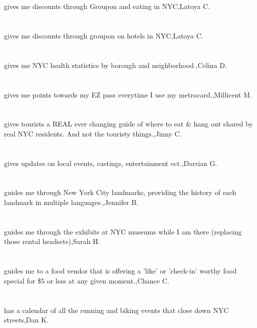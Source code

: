 \section{}gives me discounts through Groupon and  eating in NYC,Latoya C.
\section{}gives me discounts through groupon on hotels in NYC,Latoya C.
\section{}gives me NYC health statistics by borough and neighborhood.,Celina D.
\section{}  gives me points towards my EZ pass everytime I use my metrocard.,Millicent M.
\section{}gives tourists a REAL ever changing guide of where to eat \& hang out shared by real NYC residents. And not the touristy things.,Jinny C.
\section{}gives updates on local events, castings, entertainment ect.,Darrian G.
\section{}guides me through New York City landmarks, providing the history of each landmark in multiple languages.,Jennifer B.	
\section{}guides me through the exhibits at NYC museums while I am there (replacing those rental headsets),Sarah H.	
\section{}guides me to a food vendor that is offering a 'like' or 'check-in' worthy food special for \$5 or less at any given moment.,Chance C.	
\section{}has a calendar of all the running and biking events that close down NYC streets,Dan K.	
